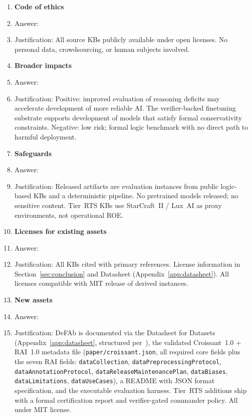 \documentclass{article}
\theoremstyle{definition}
\begin{document}
\begin{enumerate}
\item {\bf Code of ethics}
    \item[] Answer: \answerYes{}
    \item[] Justification: All source KBs publicly available under open licenses. No personal data, crowdsourcing, or human subjects involved.

\item {\bf Broader impacts}
    \item[] Answer: \answerYes{}
    \item[] Justification: Positive: improved evaluation of reasoning deficits may accelerate development of more reliable AI. The verifier-backed finetuning substrate supports development of models that satisfy formal conservativity constraints. Negative: low risk; formal logic benchmark with no direct path to harmful deployment.

\item {\bf Safeguards}
    \item[] Answer: \answerNA{}
    \item[] Justification: Released artifacts are evaluation instances from public logic-based KBs and a deterministic pipeline. No pretrained models released; no sensitive content. Tier~RTS KBs use StarCraft~II / Lux~AI as proxy environments, not operational ROE.

\item {\bf Licenses for existing assets}
    \item[] Answer: \answerYes{}
    \item[] Justification: All KBs cited with primary references. License information in Section~\ref{sec:conclusion} and Datasheet (Appendix~\ref{app:datasheet}). All licenses compatible with MIT release of derived instances.

\item {\bf New assets}
    \item[] Answer: \answerYes{}
    \item[] Justification: DeFAb is documented via the Datasheet for Datasets (Appendix~\ref{app:datasheet}, structured per~\citep{gebru2018datasheets}), the validated Croissant~1.0 + RAI~1.0 metadata file (\texttt{paper/croissant.json}, all required core fields plus the seven RAI fields: \texttt{dataCollection}, \texttt{dataPreprocessingProtocol}, \texttt{dataAnnotationProtocol}, \texttt{dataReleaseMaintenancePlan}, \texttt{dataBiases}, \texttt{dataLimitations}, \texttt{dataUseCases}), a README with JSON format specification, and the executable evaluation harness. Tier~RTS additions ship with a formal certification report and verifier-gated commander policy. All under MIT license.


\end{enumerate}
\end{document}
